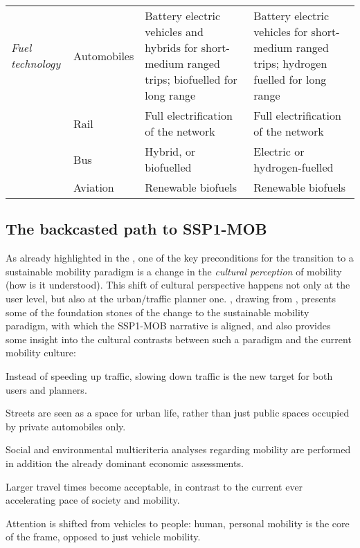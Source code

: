 \begin{landscape}
{\begin{longtable}{p{2.5cm}p{3.5cm}p{6cm}p{6cm}}
\textit{Fuel technology} & Automobiles & Battery electric vehicles and hybrids for short-medium ranged trips; biofuelled for long range & Battery electric vehicles for short-medium ranged trips; hydrogen fuelled for long range \\*
 & Rail & Full electrification of the network & Full electrification of the network \\*
 & Bus & Hybrid, or biofuelled & Electric or hydrogen-fuelled \\*
 & Aviation & Renewable biofuels & Renewable biofuels
\end{longtable}
}
\end{landscape}

\subsection{The backcasted path to SSP1-MOB}
\label{ss:results:backcasting-the-path}
As already highlighted in the , one of the key preconditions for the transition to a sustainable mobility paradigm is a change in the \emph{cultural perception} of mobility (how is it understood). This shift of cultural perspective happens not only at the user level, but also at the urban/traffic planner one. \textcite{banister2008_sustainablemobilityparadigm}, drawing from \textcite{marshall2001_challengesustainabletransport}, presents some of the foundation stones of the change to the sustainable mobility paradigm, with which the SSP1-MOB narrative is aligned, and also provides some insight into the cultural contrasts between such a paradigm and the current mobility culture:
%
\begin{enumeratealpha}
\item Instead of speeding up traffic, slowing down traffic is the new target for both users and planners.
\item Streets are seen as a space for urban life, rather than just public spaces occupied by private automobiles only.
\item Social and environmental multicriteria analyses regarding mobility are performed in addition the already dominant economic assessments.
\item Larger travel times become acceptable, in contrast to the current ever accelerating pace of society and mobility.
\item Attention is shifted from vehicles to people: human, personal mobility is the core of the frame, opposed to just vehicle mobility.
\end{enumeratealpha}

